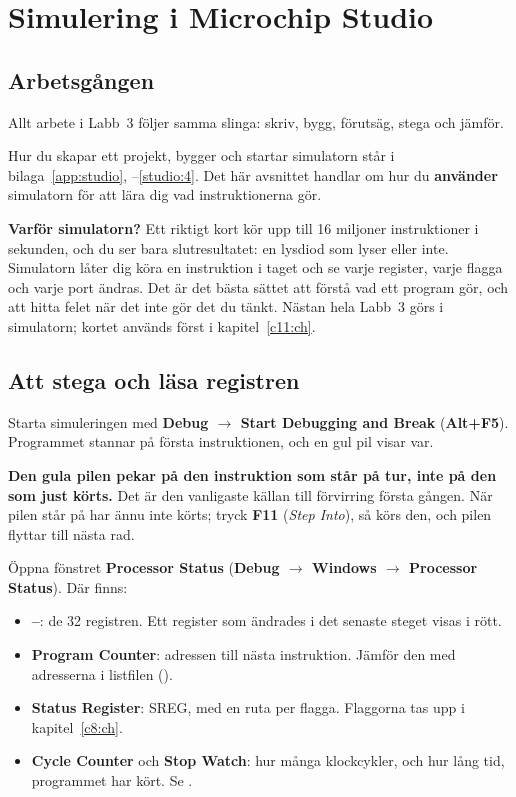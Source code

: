 
\section{Simulering i Microchip Studio}
\label{c7:app:c}

\subsection{Arbetsgången}
\label{c7:c1}
Allt arbete i Labb~3 följer samma slinga: skriv, bygg, förutsäg, stega och jämför.


Hur du skapar ett projekt, bygger och startar simulatorn står i bilaga~\ref{app:studio},
--\ref{studio:4}. Det här avsnittet handlar om hur du \textbf{använder}
simulatorn för att lära dig vad instruktionerna gör.

\textbf{Varför simulatorn?} Ett riktigt kort kör upp till 16 miljoner instruktioner i sekunden, och
du ser bara slutresultatet: en lysdiod som lyser eller inte. Simulatorn låter dig köra en
instruktion i taget och se varje register, varje flagga och varje port ändras. Det är det bästa
sättet att förstå vad ett program gör, och att hitta felet när det inte gör det du tänkt. Nästan
hela Labb~3 görs i simulatorn; kortet används först i kapitel~\ref{c11:ch}.

\subsection{Att stega och läsa registren}
\label{c7:c2}
Starta simuleringen med \textbf{Debug $\rightarrow$ Start Debugging and Break}
(\textbf{Alt+F5}). Programmet stannar på första instruktionen, och en gul pil visar var.

\textbf{Den gula pilen pekar på den instruktion som står på tur, inte på den som just körts.} Det
är den vanligaste källan till förvirring första gången. När pilen står på  har
 ännu inte körts; tryck \textbf{F11} (\emph{Step Into}), så körs den, och pilen
flyttar till nästa rad.

Öppna fönstret \textbf{Processor Status} (\textbf{Debug $\rightarrow$ Windows $\rightarrow$
Processor Status}). Där finns:
\begin{itemize}
  \item \textbf{--}: de 32 registren. Ett register som ändrades i det senaste
    steget visas i rött.
  \item \textbf{Program Counter}: adressen till nästa instruktion. Jämför den med adresserna i
    listfilen ().
  \item \textbf{Status Register}: SREG, med en ruta per flagga. Flaggorna tas upp i
    kapitel~\ref{c8:ch}.
  \item \textbf{Cycle Counter} och \textbf{Stop Watch}: hur många klockcykler, och hur lång tid,
    programmet har kört. Se .
\end{itemize}

